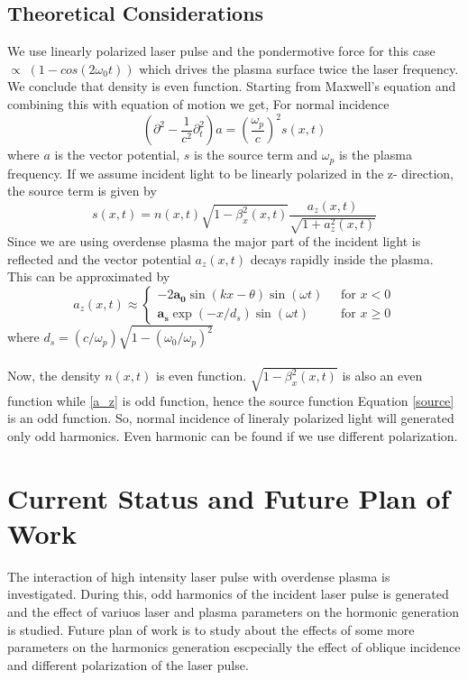 \documentclass[12pt]{article}
\newenvironment{changemargin}[2]{%
\begin{list}{}{%
\setlength{\topsep}{0pt}%
\setlength{\leftmargin}{#1}%
\setlength{\rightmargin}{#2}%
\setlength{\listparindent}{\parindent}%
\setlength{\itemindent}{\parindent}%
\setlength{\parsep}{\parskip}%
}%
\item[]}{\end{list}}
\begin{document}
\begin{changemargin}{-2cm}{-2cm}
    \subsection{Theoretical Considerations}
    We use linearly polarized laser pulse and the pondermotive force for this case $\propto \; (1-cos(2\omega_0t))$ which drives the plasma surface twice the laser frequency. We conclude that density is even function.
    Starting from Maxwell's  equation and combining this with equation of motion we get, For normal incidence
    \begin{equation}
        \left (\partial^2 - \frac{1}{c^2}\partial_t^2\right )a = \left (\frac{\omega_p}{c}\right )^2s(x,t)
    \end{equation}
    where $a$ is the vector potential, $s$ is the source term and $\omega_p$ is the plasma frequency. If we assume incident light to be linearly polarized in the z- direction, the source term is given by
    \begin{equation}\label{source}
        s(x,t) = n(x,t)\sqrt{1-\beta_x^2(x,t)}\frac{a_z(x,t)}{\sqrt{1+a_z^2(x,t)}}
    \end{equation}
    Since we are using overdense plasma the major part of the incident light is reflected and the vector potential $a_z(x,t)$  decays rapidly inside the plasma. This can be  approximated by
    \begin{equation}\label{a_z}
        a_z(x,t) \approx \begin{cases}
            -2\mathbf{a_0}\sin(kx-\theta)\sin(\omega t) \; & \text{ for } x < 0   \\
            \mathbf{a_s}\exp(-x/d_s)\sin(\omega t)  \;     & \text{ for } x \ge 0
        \end{cases}
    \end{equation}
    where $d_s = (c/\omega_p)\sqrt{1-(\omega_0 / \omega_p)^2}$\\ \\
    Now, the density $n(x,t)$ is even function. $\sqrt{1-\beta_x^2(x,t)}$ is also an even function while \ref{a_z} is odd function, hence the source function Equation \ref{source} is an odd function. So, normal incidence of lineraly polarized light will generated only odd harmonics. Even harmonic can be found if we use different polarization. \cite{lichters}
    \section{Current Status and Future Plan of Work}
    The interaction of high intensity laser pulse with overdense plasma is investigated. During this, odd harmonics of the incident laser pulse is generated and the effect of variuos laser and plasma parameters on the hormonic generation is studied. Future plan of work is to study about the effects of some more parameters on the harmonics generation escpecially the effect of oblique incidence and different polarization of the laser pulse.

\end{changemargin}
\end{document}
